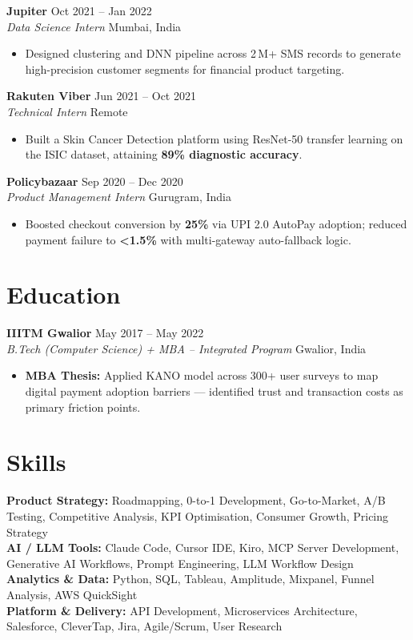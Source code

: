\documentclass[letterpaper,10.5pt]{article}
\newcommand{\roleheader}[4]{%
  \vspace{4pt}
  \noindent\textbf{\color{darktext}#1}%
  \hfill{\small\color{lighttext}#4}\\[1pt]
  {\color{medtext}\textit{#2}}%
  \hfill{\small\color{lighttext}#3}%
  \vspace{2pt}
}
\newcommand{\metric}[1]{\textbf{#1}}
\begin{document}
\roleheader{Jupiter}{Data Science Intern}{Mumbai, India}{Oct 2021 -- Jan 2022}
\begin{itemize}
  \item Designed clustering and DNN pipeline across 2\,M+ SMS records to generate high-precision customer segments for financial product targeting.
\end{itemize}

\vspace{-2pt}
\roleheader{Rakuten Viber}{Technical Intern}{Remote}{Jun 2021 -- Oct 2021}
\begin{itemize}
  \item Built a Skin Cancer Detection platform using ResNet-50 transfer learning on the ISIC dataset, attaining \metric{89\% diagnostic accuracy}.
\end{itemize}

\vspace{-2pt}
\roleheader{Policybazaar}{Product Management Intern}{Gurugram, India}{Sep 2020 -- Dec 2020}
\begin{itemize}
  \item Boosted checkout conversion by \metric{25\%} via UPI 2.0 AutoPay adoption; reduced payment failure to \metric{<1.5\%} with multi-gateway auto-fallback logic.
\end{itemize}

\section{Education}

\roleheader{IIITM Gwalior}{B.Tech (Computer Science) + MBA -- Integrated Program}{Gwalior, India}{May 2017 -- May 2022}
\begin{itemize}
  \item \textbf{MBA Thesis:} Applied KANO model across 300+ user surveys to map digital payment adoption barriers — identified trust and transaction costs as primary friction points.
\end{itemize}

\section{Skills}
\vspace{2pt}
\noindent
\textbf{Product Strategy:} Roadmapping, 0-to-1 Development, Go-to-Market, A/B Testing, Competitive Analysis, KPI Optimisation, Consumer Growth, Pricing Strategy \\[3pt]
\textbf{AI / LLM Tools:} Claude Code, Cursor IDE, Kiro, MCP Server Development, Generative AI Workflows, Prompt Engineering, LLM Workflow Design \\[3pt]
\textbf{Analytics \& Data:} Python, SQL, Tableau, Amplitude, Mixpanel, Funnel Analysis, AWS QuickSight \\[3pt]
\textbf{Platform \& Delivery:} API Development, Microservices Architecture, Salesforce, CleverTap, Jira, Agile/Scrum, User Research
\end{document}
